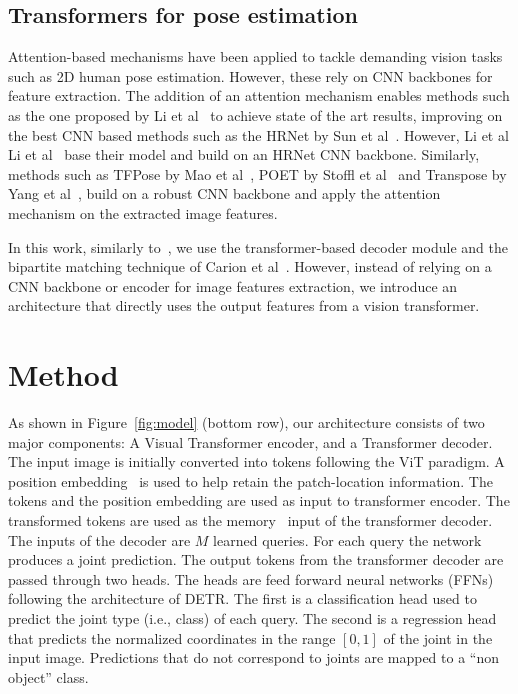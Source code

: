 \documentclass[runningheads]{llncs}
\begin{document}
\subsection{Transformers for pose estimation}
Attention-based mechanisms have been applied to tackle demanding vision tasks  such as 2D human pose estimation. However, these rely on CNN backbones for feature extraction. 
The addition of an attention mechanism enables methods such as the one proposed by Li et al~\cite{li2021pose} to achieve state of the art results, improving on the best CNN based methods such as the HRNet by Sun et al~\cite{sun2019deep}.
However, Li et al Li et al~\cite{li2021pose} base their model and build on an HRNet CNN backbone. Similarly, methods such as 
TFPose by Mao et al~\cite{mao2021tfpose}, POET by Stoffl et al~\cite{stoffl2021end} and 
Transpose by Yang et al~\cite{yang2021transpose}, build on a robust CNN backbone and 
apply the attention mechanism on the extracted image features.




In this work, similarly to~\cite{li2021pose}, we use the transformer-based decoder module 
and the bipartite matching technique of Carion et al~\cite{carion2020end}. However, instead of relying on a CNN backbone or encoder for image features extraction, we introduce an architecture that directly uses the output features from a vision transformer.






\section{Method}
\label{sec:method}


As shown in Figure~\ref{fig:model} (bottom row), our architecture consists of two major components: A Visual Transformer encoder, and a Transformer decoder. The input image is initially converted into tokens following the ViT paradigm.
A position embedding~\cite{vaswani2017attention} is used to help retain the patch-location information.
The tokens and the position embedding are used as input to transformer encoder.
The transformed tokens are used as the memory~\cite{carion2020end} input of the transformer decoder.
The inputs of the decoder are $M$ learned queries.
For each query the network produces a joint prediction.
The output tokens from the transformer decoder are passed through two heads. The heads are feed forward neural networks (FFNs) following the architecture of DETR.
The first is a classification head used to predict the joint type (i.e., class) of each query.
The second is a regression head that predicts the normalized coordinates in the range $[0,1]$ 
of the joint in the input image.
Predictions that do not correspond to joints are mapped to a ``non object'' class.
\end{document}

